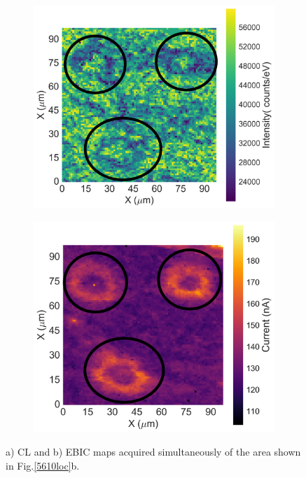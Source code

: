 \begin{figure}[h]
	\hspace*{0.5cm}
	\begin{subfigure}[b]{0.48\textwidth}
		\centering
		\includegraphics[width=1\linewidth]{Figs/Ch3/5608AsmallCL}
		\caption{}
		
	\end{subfigure}%
	\hspace*{0.5cm}
	\begin{subfigure}[b]{0.48\textwidth}
		\centering
		\includegraphics[width=0.98\linewidth]{Figs/Ch3/5608smallEBIC}
		\caption{}
	\end{subfigure}%
	
	\caption{a) CL and b) EBIC maps acquired simultaneously of the area shown in Fig.\ref{5610loc}b.}
	\label{5608CLEBIC}
\end{figure}
\FloatBarrier

